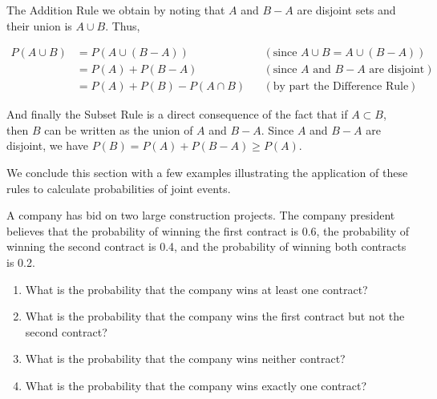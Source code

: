 The Addition Rule we obtain by noting that $A$ and $B-A$ are disjoint sets and their union is $A \cup B$. Thus,

\begin{align*}
    P(A \cup B) &= P(A \cup (B - A)) && (\text{since } A \cup B = A \cup (B - A)) \\
                &= P(A) + P(B - A) && (\text{since } A \text{ and } B - A \text{ are disjoint}) \\
                &= P(A) + P(B) - P(A \cap B) && (\text{by part the Difference Rule})
    \end{align*}

And finally the Subset Rule is a direct consequence of the fact that if $A \subset B$, then $B$ can be written as the union of $A$ and $B-A$. Since $A$ and $B-A$ are disjoint, we have $P(B)=P(A)+P(B-A) \geq P(A)$.

We conclude this section with a few examples illustrating the application of these rules to calculate probabilities of joint events.

\begin{example}
    A company has bid on two large construction projects. The company president believes that the probability of winning the first contract is 0.6, the probability of winning the second contract is 0.4, and the probability of winning both contracts is 0.2.

    \begin{enumerate}[label=(\alph*)]
        \item What is the probability that the company wins at least one contract?
        \item What is the probability that the company wins the first contract but not the second contract?
        \item What is the probability that the company wins neither contract?
        \item What is the probability that the company wins exactly one contract?
    \end{enumerate}
\end{example}

